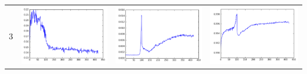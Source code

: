 \documentclass[14pt, a4paper]{extarticle}
\begin{document}
\begin{table}[!htb]
{\begin{tabular}{|c|c|c|c|}
\hline
3 & \includegraphics[scale=0.3]{images/ks_3.png} & \includegraphics[scale=0.3]{images/cvm_3.png} & \includegraphics[scale=0.3]{images/auc_3.png} \\

\end{tabular}}
\end{table}
\end{document}

